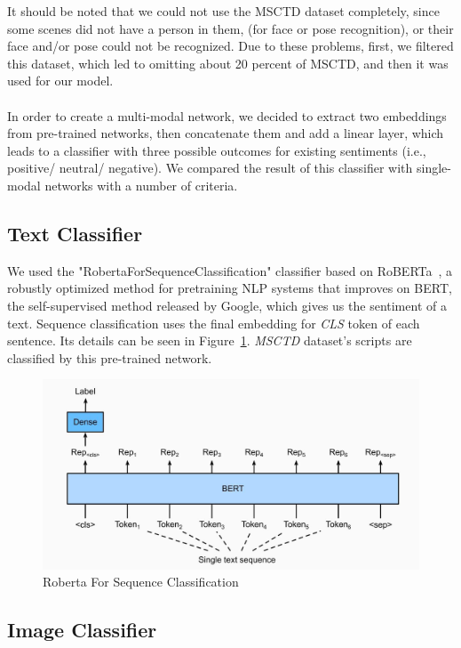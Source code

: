 It should be noted that we could not use the MSCTD dataset completely, since some scenes did not have a person in them, (for face or pose recognition), or their face and/or pose could not be recognized. Due to these problems, first, we filtered this dataset, which led to omitting about 20 percent of MSCTD, and then it was used for our model.
\paragraph{} In order to create a multi-modal network, we decided to extract two embeddings from pre-trained networks, then concatenate them and add a linear layer, which leads to a classifier with three possible outcomes for existing sentiments  (i.e., positive/ neutral/ negative). We compared the result of this classifier with single-modal networks with a number of criteria. 

\subsection{Text Classifier}
We used the "RobertaForSequenceClassification" classifier based on RoBERTa~\cite{liu2019roberta}, a robustly optimized method for pretraining NLP systems that improves on BERT, the self-supervised method released by Google, which gives us the sentiment of a text. Sequence classification uses the final embedding for \textit{CLS} token of each sentence. Its details can be seen in Figure~\ref{fig:CLS}. \textit{MSCTD} dataset's scripts are classified by this pre-trained network. 

\begin{figure}[t]
	\centering
	\includegraphics[width=\linewidth]{fig/CLS}
	\caption{Roberta For Sequence Classification}
	\label{fig:CLS}
\end{figure}

\subsection{Image Classifier}

